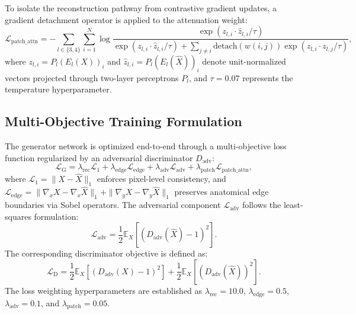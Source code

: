 \documentclass[journal]{IEEEtran}
\begin{document}
To isolate the reconstruction pathway from contrastive gradient updates, a gradient detachment operator is applied to the attenuation weight:
\begin{equation}
\mathcal{L}_{\text{patch\_attn}} = -\sum_{l \in \{3,4\}} \sum_{i=1}^N \log \frac{\exp\left(z_{l,i} \cdot \hat{z}_{l,i} / \tau\right)}{\exp\left(z_{l,i} \cdot \hat{z}_{l,i} / \tau\right) + \sum_{j \neq i} \text{detach}\left(w(i,j)\right) \exp\left(z_{l,i} \cdot z_{l,j} / \tau\right)},
\end{equation}
where $z_{l,i} = P_l(E_l(X))_i$ and $\hat{z}_{l,i} = P_l(E_l(\hat{X}))_i$ denote unit-normalized vectors projected through two-layer perceptrons $P_l$, and $\tau = 0.07$ represents the temperature hyperparameter.

\subsection{Multi-Objective Training Formulation}
The generator network is optimized end-to-end through a multi-objective loss function regularized by an adversarial discriminator $D_{\text{adv}}$:
\begin{equation}
\mathcal{L}_{\text{G}} = \lambda_{\text{rec}} \mathcal{L}_1 + \lambda_{\text{edge}} \mathcal{L}_{\text{edge}} + \lambda_{\text{adv}} \mathcal{L}_{\text{adv}} + \lambda_{\text{patch}} \mathcal{L}_{\text{patch\_attn}},
\end{equation}
where $\mathcal{L}_1 = \|X - \hat{X}\|_1$ enforces pixel-level consistency, and $\mathcal{L}_{\text{edge}} = \|\nabla_x X - \nabla_x \hat{X}\|_1 + \|\nabla_y X - \nabla_y \hat{X}\|_1$ preserves anatomical edge boundaries via Sobel operators. The adversarial component $\mathcal{L}_{\text{adv}}$ follows the least-squares formulation:
\begin{equation}
\mathcal{L}_{\text{adv}} = \frac{1}{2} \mathbb{E}_{X}\left[\left(D_{\text{adv}}(\hat{X}) - 1\right)^2\right].
\end{equation}
The corresponding discriminator objective is defined as:
\begin{equation}
\mathcal{L}_{\text{D}} = \frac{1}{2} \mathbb{E}_{X}\left[\left(D_{\text{adv}}(X) - 1\right)^2\right] + \frac{1}{2} \mathbb{E}_{X}\left[\left(D_{\text{adv}}(\hat{X})\right)^2\right].
\end{equation}
The loss weighting hyperparameters are established as $\lambda_{\text{rec}} = 10.0$, $\lambda_{\text{edge}} = 0.5$, $\lambda_{\text{adv}} = 0.1$, and $\lambda_{\text{patch}} = 0.05$.
\end{document}
